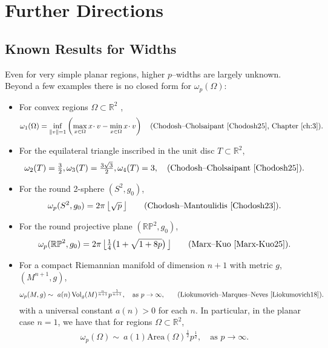 \chapter{Further Directions}
\label{ch:5}

\section{Known Results for Widths}
Even for very simple planar regions, higher $p$–widths are largely unknown. Beyond a few examples there is no closed form for $\omega_p(\Omega)$:
\begin{itemize}
  \item For convex regions $\Omega\subset\mathbb{R}^2$ ,
        \begin{align*}
        \omega_1(\Omega)=\inf_{\|v\|=1}\left(\max_{x\in\Omega} x\!\cdot v-\min_{x\in\Omega} x\!\cdot v\right)
        \quad\text{(Chodosh--Cholsaipant~\cite{Chodosh25}, Chapter~\ref{ch:3}).}
        \end{align*}
    \item For the equilateral triangle inscribed in the unit disc $T\subset\mathbb{R}^2$,
        \[
        \omega_2(T)=\tfrac{3}{2}, \omega_3(T)=\tfrac{3\sqrt{3}}{2}, \omega_4(T)=3, 
        \quad\text{(Chodosh--Cholsaipant~\cite{Chodosh25}).}
        \]
  \item For the round 2-sphere $(S^2,g_0)$,
        \begin{align*}
        \omega_p(S^2,g_0)=2\pi\,\big\lfloor\sqrt{p}\,\big\rfloor
        \qquad\text{(Chodosh--Mantoulidis~\cite{Chodosh23}).}
        \end{align*}
  \item For the round projective plane $(\mathbb{RP}^2,g_0)$,
        \begin{align*}
        \omega_p(\mathbb{RP}^2,g_0)=2\pi\,\big\lfloor\tfrac{1}{4}\big(1+\sqrt{1+8p}\big)\,\big\rfloor
        \qquad\text{(Marx--Kuo~\cite{Marx-Kuo25}).}
        \end{align*}
  \item For a compact Riemannian manifold of dimension $n+1$ with metric $g$, $(M^{n+1}, g)$,
        \begin{align*}
        \omega_p(M,g) \sim\ a(n)\operatorname{Vol}_g(M)^{\frac{n}{n+1}}p^{\frac{1}{n+1}},\quad\text{as $p\to\infty,$}\qquad\text{(Liokumovich--Marques--Neves~\cite{Liokumovich18}).} 
        \end{align*}
        with a universal constant $a(n)>0$ for each $n$.  In particular, in the planar case $n=1$, we have that for regions $\Omega\subset\mathbb{R}^2$,
        \begin{align*}
        \omega_p(\Omega) \sim\ a(1)\mathrm{Area}(\Omega)^{\frac{1}{2}}p^{\frac{1}{2}},\quad \text{as $p\to\infty$.}
        \end{align*}
\end{itemize}


